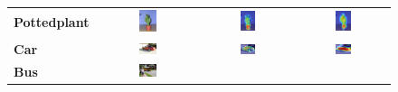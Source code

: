 \begin{figure}[ht]
\begin{tcolorbox}[colframe=black!60, colback=white, boxrule=0.8pt, arc=2pt, left=2pt, right=2pt, top=2pt, bottom=2pt]
\begin{tabular}{m{2.5cm} c c c}
    \\
    \textbf{Pottedplant}
    & \includegraphics[width=0.18\textwidth,height=0.18\textwidth]{figures/originals/2011_000145}
    & \includegraphics[width=0.18\textwidth,height=0.18\textwidth]{figures/val_cams/weclip/2011_000145_15}
    & \includegraphics[width=0.18\textwidth,height=0.18\textwidth]{figures/val_cams/ours/2011_000145_15}
    \\
    \textbf{Car}
    & \includegraphics[width=0.18\textwidth,height=0.18\textwidth]{figures/originals/2010_005119}
    & \includegraphics[width=0.18\textwidth,height=0.18\textwidth]{figures/val_cams/weclip/2010_005119_6}
    & \includegraphics[width=0.18\textwidth,height=0.18\textwidth]{figures/val_cams/ours/2010_005119_6}
    \\
    \textbf{Bus}
    & \includegraphics[width=0.18\textwidth,height=0.18\textwidth]{figures/originals/2010_000148}

\end{tabular}
\end{tcolorbox}
\end{figure}
